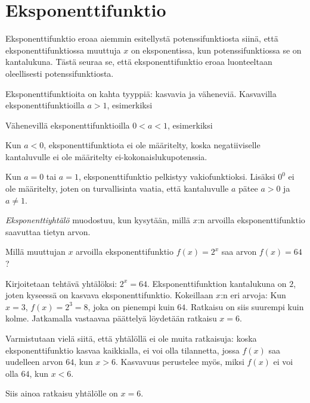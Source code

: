 \chapter{Eksponenttifunktio}


Eksponenttifunktio eroaa aiemmin esitellystä potenssifunktiosta siinä, että
eksponenttifunktiossa muuttuja $x$ on eksponentissa, kun potenssifunktiossa
se on kantalukuna. Tästä seuraa se, että eksponenttifunktio eroaa luonteeltaan
oleellisesti potenssifunktiosta.

Eksponenttifunktioita on kahta tyyppiä: kasvavia ja väheneviä.
Kasvavilla eksponenttifunktioilla $a>1$, esimerkiksi


Vähenevillä eksponenttifunktioilla $0<a<1$, esimerkiksi


Kun $a<0$, eksponenttifunktiota ei ole määritelty, koska negatiiviselle
kantaluvulle ei ole määritelty ei-kokonaislukupotenssia.

Kun $a=0$ tai $a=1$, eksponenttifunktio pelkistyy vakiofunktioksi.
Lisäksi $0^0$ ei ole määritelty, joten on turvallisinta vaatia, että
kantaluvulle $a$ pätee $a>0$ ja $a \neq 1$.

\emph{Eksponenttiyhtälö} muodostuu, kun kysytään, millä $x$:n arvoilla eksponenttifunktio saavuttaa tietyn arvon.

\begin{esimerkki}
Millä muuttujan $x$ arvoilla eksponenttifunktio $f(x) = 2^x$ saa arvon
$f(x) = 64$?

Kirjoitetaan tehtävä yhtälöksi: $2^x = 64$.
Eksponenttifunktion kantalukuna on $2$, joten kyseessä on kasvava
eksponenttifunktio. Kokeillaan $x$:n eri arvoja: Kun $x = 3$,
$f(x) = 2^3 = 8$, joka on pienempi kuin $64$. Ratkaisu on siis
suurempi kuin kolme. Jatkamalla vastaavaa päättelyä löydetään ratkaisu
$x = 6$.

Varmistutaan vielä siitä, että yhtälöllä ei ole muita ratkaisuja:
koska eksponenttifunktio kasvaa kaikkialla, ei voi olla tilannetta, jossa
$f(x)$ saa uudelleen arvon $64$, kun $x > 6$. Kasvavuus perustelee
myös, miksi $f(x)$ ei voi olla $64$, kun $x < 6$.

Siis ainoa ratkaisu yhtälölle on $x = 6$.
\end{esimerkki}

